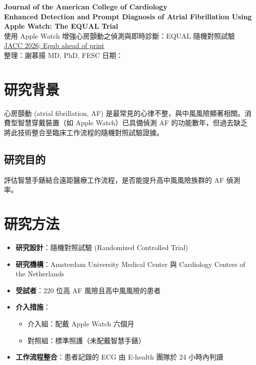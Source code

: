 \documentclass[12pt,a4paper]{article}
\begin{document}
\begin{center}
{\LARGE\bfseries\textcolor{emergency_red}{Journal of the American College of Cardiology}}\\[0.5cm]
{\Large\textbf{Enhanced Detection and Prompt Diagnosis of Atrial Fibrillation Using Apple Watch: The EQUAL Trial}}\\[0.3cm]
{\large 使用 Apple Watch 增強心房顫動之偵測與即時診斷：EQUAL 隨機對照試驗}\\[0.5cm]
{\normalsize \href{https://www.jacc.org}{JACC 2026; Epub ahead of print}}\\[0.3cm]
{\normalsize 整理：謝慕揚 MD, PhD, FESC \quad 日期：\mydate}
\end{center}

\vspace{0.5cm}

\section{研究背景}

心房顫動 (atrial fibrillation, AF) 是最常見的心律不整，與中風風險顯著相關。消費型智慧穿戴裝置（如 Apple Watch）已具備偵測 AF 的功能數年，但過去缺乏將此技術整合至臨床工作流程的隨機對照試驗證據。

\subsection{研究目的}
評估智慧手錶結合遠距醫療工作流程，是否能提升高中風風險族群的 AF 偵測率。

\section{研究方法}

\begin{itemize}
    \item \textbf{研究設計}：隨機對照試驗 (Randomized Controlled Trial)
    \item \textbf{研究機構}：Amsterdam University Medical Center 與 Cardiology Centers of the Netherlands
    \item \textbf{受試者}：220 位高 AF 風險且高中風風險的患者
    \item \textbf{介入措施}：
    \begin{itemize}
        \item 介入組：配戴 Apple Watch 六個月
        \item 對照組：標準照護（未配戴智慧手錶）
    \end{itemize}
    \item \textbf{工作流程整合}：患者記錄的 ECG 由 E-health 團隊於 24 小時內判讀
\end{itemize}
\end{document}
